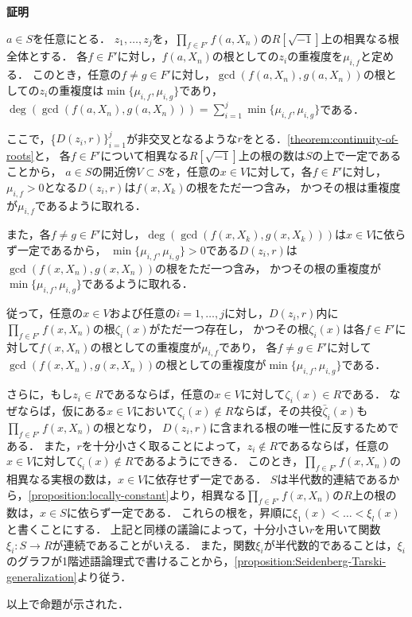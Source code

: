 \documentclass[uplatex, dvipdfmx]{jsarticle}
\makeatletter
\numberwithin{equation}{section}
\renewenvironment{proof}[1][\proofname]{\par
  \pushQED{\qed}%
  \normalfont \topsep6\p@\@plus6\p@\relax
  \trivlist
  \item\relax
  {\bfseries
  #1\@addpunct{.}}\hspace\labelsep\ignorespaces
}{
  \popQED\endtrivlist\@endpefalse
}
\newcommand{\map}[3]{{#1}\colon{#2}\rightarrow{#3}}
\theoremstyle{definition}
\renewcommand{\proofname}{\textbf{証明}}
\makeatother
\begin{document}
\begin{proof}
     $ a \in S$を任意にとる．
     $z_1, \dots, z_j $を，$\prod_{f \in F'} f(a, X_n)$の$R\left[\sqrt{-1}\right]$上の相異なる根全体とする．
     各$f \in F'$に対し，$f(a, X_n)$の根としての$z_i$の重複度を$\mu_{i, f}$と定める．
     このとき，任意の$f \neq g \in F'$に対し，$\gcd(f(a, X_n), g(a, X_n))$の根としての$z_i$の重複度は$\min\{\mu_{i,f}, \mu_{i, g}\}$であり，
     $\deg(\gcd(f(a, X_n), g(a, X_n))) = \sum_{i=1}^j \min\{\mu_{i,f}, \mu_{i, g}\}$である．

     ここで，\{$D(z_i, r)\}_{i=1}^j$が非交叉となるような$r$をとる．\cref{theorem:continuity-of-roots}と，
     各$f \in F'$について相異なる$R\left[\sqrt{-1}\right]$上の根の数は$S$の上で一定であることから，
     $a \in S$の開近傍$V \subset S$を，任意の$x \in V$に対して，各$f \in F'$に対し，$\mu_{i, f}>0$となる$D(z_i, r)$は$f(x,X_k)$の根をただ一つ含み，
     かつその根は重複度が$\mu_{i, f}$であるように取れる．

     また，各$f \neq g \in F'$に対し，$\deg(\gcd(f(x, X_k), g(x, X_k)))$は$x \in V$に依らず一定であるから，
     $\min\{\mu_{i, f}, \mu_{i,g}\} > 0$である$D(z_i, r)$は$\gcd(f(x, X_n), g(x, X_n))$の根をただ一つ含み，
     かつその根の重複度が$\min\{\mu_{i,f}, \mu_{i,g}\}$であるように取れる．

     従って，任意の$x \in V$および任意の$i=1, \dots, j$に対し，$D(z_i, r)$内に$\prod_{f \in F'} f(x, X_n)$の根$\zeta_i(x)$がただ一つ存在し，
     かつその根$\zeta_i(x)$は各$f \in F'$に対して$f(x, X_n)$の根としての重複度が$\mu_{i,f}$であり，
     各$f \neq g \in F'$に対して$\gcd(f(x, X_n),g(x, X_n))$の根としての重複度が$\min\{\mu_{i,f}, \mu_{i, g}\}$である．

     さらに，もし$z_i \in R$であるならば，任意の$x \in V$に対して$\zeta_i(x) \in R$である．
     なぜならば，仮にある$x \in V$において$\zeta_i(x) \notin R$ならば，その共役$\bar{\zeta}_i(x)$も$\prod_{f \in F'} f(x, X_n)$の根となり，
     $D(z_i, r)$に含まれる根の唯一性に反するためである． 
     また，$r$を十分小さく取ることによって，$z_i \notin R$であるならば，任意の$x \in V$に対して$\zeta_i(x) \notin R$であるようにできる．
     このとき，$\prod_{f \in F'} f(x, X_n)$の相異なる実根の数は，$x \in V$に依存せず一定である．
     $S$は半代数的連結であるから，\cref{proposition:locally-constant}より，相異なる$\prod_{f \in F'} f(x, X_n)$の$R$上の根の数は，$x \in S$に依らず一定である．
     これらの根を，昇順に$\xi_1(x) < \dots < \xi_l(x)$と書くことにする．
     上記と同様の議論によって，十分小さい$r$を用いて関数$\map{\xi_i}{S}{R}$が連続であることがいえる．
     また，関数$\xi_i$が半代数的であることは，$\xi_i$のグラフが1階述語論理式で書けることから，\cref{proposition:Seidenberg-Tarski-generalization}より従う．

     以上で命題が示された．
\end{proof}
\end{document}
